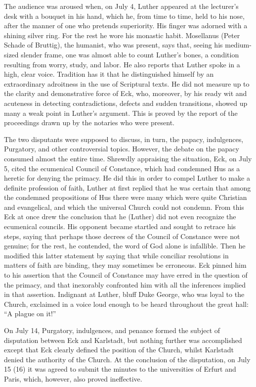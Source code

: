 The audience was aroused when, on July 4, Luther appeared at the
lecturer’s desk with a bouquet in his hand, which he, from time to
time, held to his nose, after the manner of one who pretends superiority.
His finger was adorned with a shining silver ring. For the rest he
wore his monastic habit. Mosellanus (Peter Schade of Bruttig), the
humanist, who was present, says that, seeing his medium-sized slender
frame, one was almost able to count Luther’s bones, a condition
resulting from worry, study, and labor. He also reports that Luther
spoke in a high, clear voice. Tradition has it that he distinguished
himself by an extraordinary adroitness in the use of Scriptural texts.
He did not measure up to the clarity and demonstrative force of
Eck, who, moreover, by his ready wit and acuteness in detecting
contradictions, defects and sudden transitions, showed up many a
weak point in Luther’s argument. This is proved by the report of
the proceedings drawn up by the notaries who were present.

The two disputants were supposed to discuss, in turn, the papacy,
indulgences, Purgatory, and other controversial topics. However, the
debate on the papacy consumed almost the entire time. Shrewdly
appraising the situation, Eck, on July 5, cited the ecumenical Council
of Constance, which had condemned Hus as a heretic for denying
the primacy. He did this in order to compel Luther to make a definite
profession of faith, Luther at first replied that he was certain that
among the condemned propositions of Hus there were many which
were quite Christian and evangelical, and which the universal Church
could not condemn. From this Eck at once drew the conclusion
that he (Luther) did not even recognize the ecumenical councils.
His opponent became startled and sought to retrace his steps, saying
that perhaps those decrees of the Council of Constance were not
genuine; for the rest, he contended, the word of God alone is infallible.
Then he modified this latter statement by saying that while
conciliar resolutions in matters of faith are binding, they may sometimes
be erroneous. Eck pinned him to his assertion that the Council
of Constance may have erred in the question of the primacy, and that
inexorably confronted him with all the inferences implied in that
assertion. Indignant at Luther, bluff Duke George, who
was loyal to the Church, exclaimed in a voice loud enough to be heard
throughout the great hall: “A plague on it!”

On July 14, Purgatory, indulgences, and penance formed the
subject of disputation between Eck and Karlstadt, but nothing
further was accomplished except that Eck clearly defined the position
of the Church, whilst Karlstadt denied the authority of the Church.
At the conclusion of the disputation, on July 15 (16) it was agreed
to submit the minutes to the universities of Erfurt and Paris, which,
however, also proved ineffective.

